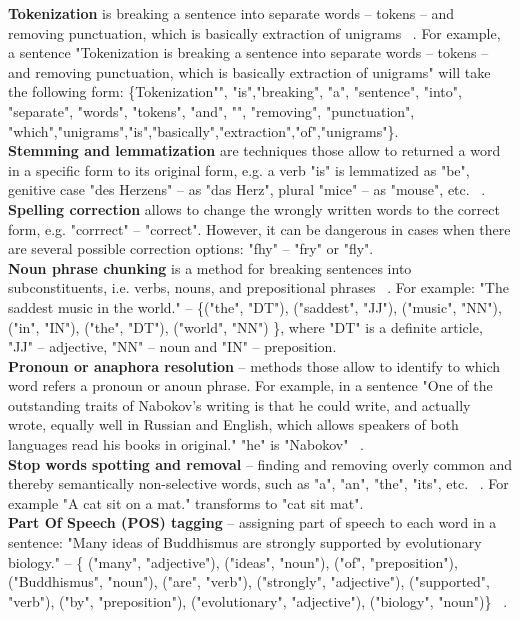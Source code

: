 \textbf{Tokenization} is breaking a sentence into separate words – tokens – and removing punctuation, which is basically extraction of unigrams ~\cite{token}. For example, a sentence "Tokenization is breaking a sentence into separate words – tokens – and removing punctuation, which is basically extraction of unigrams" will take the following form: \{Tokenization"", "is","breaking", "a", "sentence", "into", "separate", "words", "tokens", "and", "", "removing", "punctuation", "which","unigrams","is","basically","extraction","of","unigrams"\}. \\

\textbf{Stemming and lemmatization} are techniques those allow to returned a word in a specific form to its original form, e.g. a verb "is" is lemmatized as "be", genitive case "des Herzens" -- as "das Herz", plural "mice" -- as "mouse", etc. ~\cite{lemm}.\\

\textbf{Spelling correction} allows to change the wrongly written words to the correct form, e.g. "corrrect" -- "correct". However, it can be dangerous in cases when there are several possible correction options: "fhy" -- "fry" or "fly".\\

\textbf{Noun phrase chunking} is a method for breaking sentences into subconstituents, i.e. verbs, nouns, and prepositional phrases ~\cite{chunk}. For example: "The saddest music in the world." -- \{("the", "DT"), ("saddest", "JJ"), ("music", "NN"), ("in", "IN"), ("the", "DT"), ("world", "NN") \}, where "DT" is a definite article, "JJ" -- adjective, "NN" -- noun and "IN" -- preposition.\\

\textbf{Pronoun or anaphora resolution} -- methods those allow to identify to which word refers a pronoun or anoun phrase. For example, in a sentence "One of the outstanding traits of Nabokov's writing is that he could write, and actually wrote, equally well in Russian and English, which allows speakers of both languages read his books in original." "he" is "Nabokov" ~\cite{anaphora}.\\

\textbf{Stop words spotting and removal} -- finding and removing overly common and thereby semantically non-selective words, such as "a", "an", "the", "its", etc. ~\cite{stop}. For example "A cat sit on a mat." transforms to "cat sit mat".\\

\textbf{Part Of Speech (POS) tagging} -- assigning part of speech to each word in a sentence: "Many ideas of Buddhismus are strongly supported by evolutionary biology." -- \{ ("many", "adjective"), ("ideas", "noun"), ("of", "preposition"), ("Buddhismus", "noun"), ("are", "verb"), ("strongly", "adjective"), ("supported", "verb"), ("by", "preposition"), ("evolutionary", "adjective"),  ("biology", "noun")\} ~\cite{POS}.


